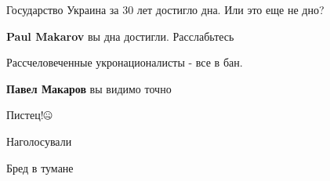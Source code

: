 \begin{itemize}
\begin{itemize}
\end{itemize}

%
%

Государство Украина за 30 лет достигло дна. Или это еще не дно?

\begin{itemize}
 
\textbf{Paul Makarov} вы дна достигли. Расслабьтесь

 
Рассчеловеченные укронационалисты - все в бан.

 
\textbf{Павел Макаров} вы видимо точно 🤯
\end{itemize}

 
Пистец!🤐

 
Наголосували

 
Бред в тумане


\end{itemize}
